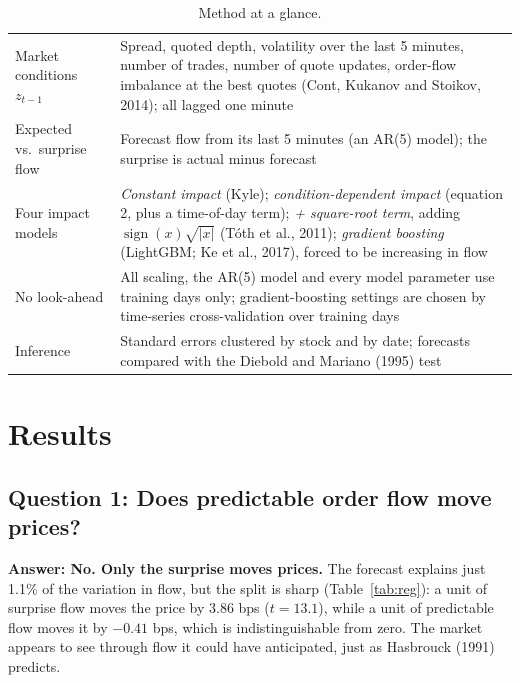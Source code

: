 \documentclass[10pt,letterpaper]{article}
\newcommand{\answer}[1]{\textbf{\color{ink}Answer: #1}}
\begin{document}
\begin{table}[h]
\centering\small
\caption{Method at a glance.}\label{tab:method}
\begin{tabularx}{\textwidth}{@{}p{3.3cm}X@{}}
\toprule
Market conditions $z_{t-1}$ & Spread, quoted depth, volatility over the last 5 minutes, number of trades, number of quote updates, order-flow imbalance at the best quotes (Cont, Kukanov and Stoikov, 2014); all lagged one minute \\
Expected vs.\ surprise flow & Forecast flow from its last 5 minutes (an AR(5) model); the surprise is actual minus forecast \\
Four impact models & \emph{Constant impact} (Kyle); \emph{condition-dependent impact} (equation 2, plus a time-of-day term); \emph{+ square-root term}, adding $\operatorname{sign}(x)\sqrt{|x|}$ (T\'oth et al., 2011); \emph{gradient boosting} (LightGBM; Ke et al., 2017), forced to be increasing in flow \\
No look-ahead & All scaling, the AR(5) model and every model parameter use training days only; gradient-boosting settings are chosen by time-series cross-validation over training days \\
Inference & Standard errors clustered by stock and by date; forecasts compared with the Diebold and Mariano (1995) test \\
\bottomrule
\end{tabularx}
\end{table}

\section{Results}\label{sec:results}

\subsection{Question 1: Does predictable order flow move prices?}
\answer{No. Only the surprise moves prices.} The forecast explains just 1.1\% of the variation in flow, but the split is sharp (Table~\ref{tab:reg}): a unit of surprise flow moves the price by 3.86 bps ($t = 13.1$), while a unit of predictable flow moves it by $-0.41$ bps, which is indistinguishable from zero. The market appears to see through flow it could have anticipated, just as Hasbrouck (1991) predicts.
\end{document}
